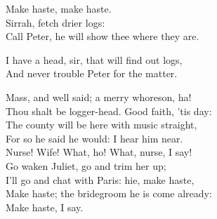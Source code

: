 \begin{speech}
Make haste, make haste.  \\
Sirrah, fetch drier logs: \\
Call Peter, he will show thee where they are. \\
\end{speech}
\begin{speech}
I have a head, sir, that will find out logs,
\\
And never trouble Peter for the matter.  \\
\end{speech}
\begin{speech}
Mass, and well said; a merry whoreson, ha! \\
Thou shalt be logger-head. Good faith, 'tis day: \\
The county will be here with music straight, \\
For so he said he would: I hear him near. 
\\
Nurse! Wife! What, ho! What, nurse, I say! 
\\
Go waken Juliet, go and trim her up; \\
I'll go and chat with Paris: hie, make haste, \\
Make haste; the bridegroom he is come already: \\
Make haste, I say.  \\
\end{speech}



